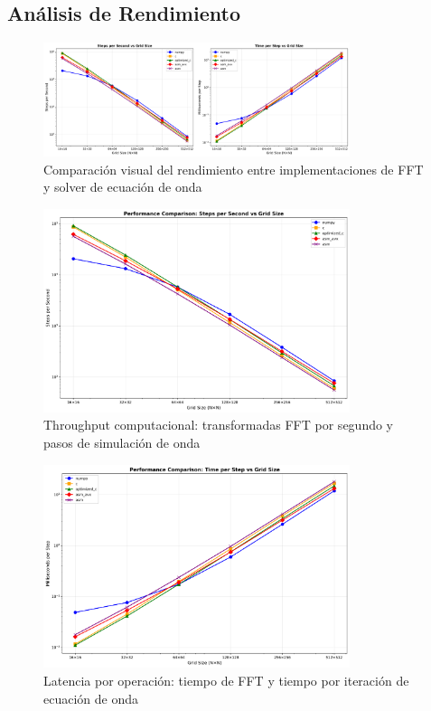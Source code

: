 \documentclass[a4paper]{article}
\begin{document}
\subsection{Análisis de Rendimiento}

\begin{figure}[h]
\centering
\includegraphics[width=0.8\textwidth]{../results/combined_performance.png}
\caption{Comparación visual del rendimiento entre implementaciones de FFT y solver de ecuación de onda}
\label{fig:performance}
\end{figure}

\begin{figure}[h]
\centering
\includegraphics[width=0.8\textwidth]{../results/steps_per_second.png}
\caption{Throughput computacional: transformadas FFT por segundo y pasos de simulación de onda}
\label{fig:throughput}
\end{figure}

\begin{figure}[h]
\centering
\includegraphics[width=0.8\textwidth]{../results/milliseconds_per_step.png}
\caption{Latencia por operación: tiempo de FFT y tiempo por iteración de ecuación de onda}
\label{fig:latency}
\end{figure}
\end{document}
